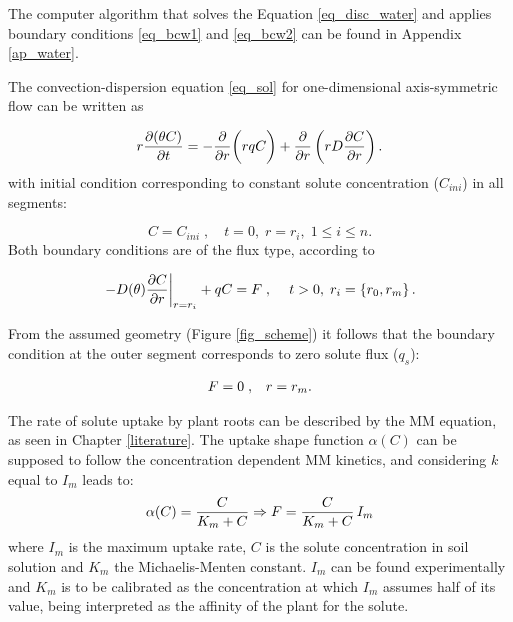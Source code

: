 The computer algorithm that solves the Equation \ref{eq_disc_water} and applies boundary conditions \ref{eq_bcw1} and \ref{eq_bcw2} can be found in Appendix \ref{ap_water}.

The convection-dispersion equation \ref{eq_sol} for one-dimensional axis-symmetric flow can be written as

\begin{equation}
\label{eq_complete_solute}
r {\partial(\theta C) \over \partial t} = -{\partial \over \partial r} \biggl(r q C \biggr) + {\partial  \over \partial r} \left( r D {\partial C \over \partial r} \right).
\end{equation}
%
with initial condition corresponding to constant solute concentration ($C_{ini}$) in all segments:

\begin{equation}
C = C_{ini}\;, \quad t=0,\; r=r_i,\; 1 \leq i \leq n.
\end{equation}
%
Both boundary conditions are of the flux type, according to 

\begin{equation}
  \label{eq_boundary_sol}
  \left. -D(\theta) {\partial C \over \partial r} \right|_{r=r_i} + qC = F\;{\rm ,} \;\;\;\;\; t>0,\; r_i=\{r_0,r_m\}\,.
\end{equation}


From the assumed geometry (Figure \ref{fig_scheme}) it follows that the boundary condition at the outer segment corresponds to zero solute flux ($q_s$):

\begin{align}
  \label{eq_bcrm}
  F &= 0\;{\rm ,} &r=r_m.
\end{align}

The rate of solute uptake by plant roots can be described by the MM equation, as seen in Chapter \ref{literature}. 
The uptake shape function $\alpha(C)$ can be supposed to follow the concentration dependent MM kinetics, and considering $k$ equal to $I_m$ leads to:
\begin{equation}
  \label{eq_MM1}
\alpha(C) = {C \over K_m+C} \Rightarrow F = {C \over K_m+C}\, I_m
\end{equation}
%
where $I_m$ is the maximum uptake rate, $C$ is the solute concentration in soil solution and $K_m$ the Michaelis-Menten constant. 
$I_m$ can be found experimentally and $K_m$ is to be calibrated as the concentration at which $I_m$ assumes half of its value, being interpreted as the affinity of the plant for the solute. 


